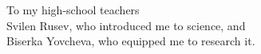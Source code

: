 \thispagestyle{empty}
{}

\vspace*{2cm}

\begin{center}
    To my high-school teachers \\%
    Svilen Rusev, who introduced me to science, and \\ %
    Biserka Yovcheva, who equipped me to research it.



\end{center}

\medskip
